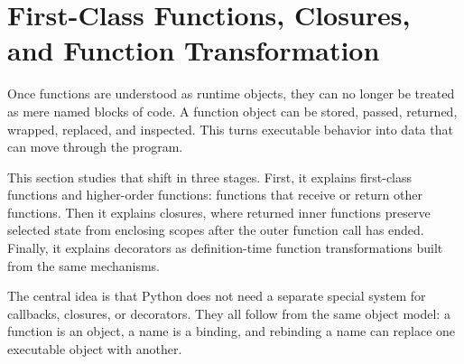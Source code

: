 \section{First-Class Functions, Closures, and Function Transformation}

Once functions are understood as runtime objects, they can no longer be treated as mere named blocks of code. A function object can be stored, passed, returned, wrapped, replaced, and inspected. This turns executable behavior into data that can move through the program.

This section studies that shift in three stages. First, it explains first-class functions and higher-order functions: functions that receive or return other functions. Then it explains closures, where returned inner functions preserve selected state from enclosing scopes after the outer function call has ended. Finally, it explains decorators as definition-time function transformations built from the same mechanisms.

The central idea is that Python does not need a separate special system for callbacks, closures, or decorators. They all follow from the same object model: a function is an object, a name is a binding, and rebinding a name can replace one executable object with another.